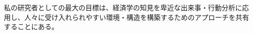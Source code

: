 \documentclass[dvipdfmx, 12pt]{jsarticle}
\begin{document}
私の研究者としての最大の目標は、経済学の知見を卑近な出来事・行動分析に応用し、人々に受け入れられやすい環境・構造を構築するためのアプローチを共有することにある。
\end{document}
